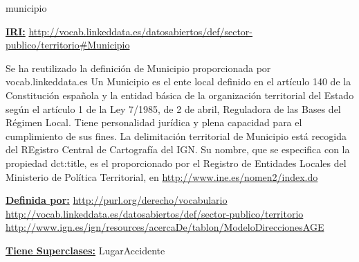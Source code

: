 \begin{mybox}{municipio}
\begin{flushleft}
\underline{\textbf{IRI:}}
\url{http://vocab.linkeddata.es/datosabiertos/def/sector-publico/territorio#Municipio}
\newline

Se ha reutilizado la definición de Municipio proporcionada por vocab.linkeddata.es \cite{datoabiertos_municipio}
Un Municipio es el ente local definido en el artículo 140 de la Constitución española y la entidad básica de la organización territorial del Estado según el artículo 1 de la Ley 7/1985, de 2 de abril, Reguladora de las Bases del Régimen Local. Tiene personalidad jurídica y plena capacidad para el cumplimiento de sus fines. La delimitación territorial de Municipio está recogida del REgistro Central de Cartografía del IGN. Su nombre, que se especifica con la propiedad dct:title, es el proporcionado por el Registro de Entidades Locales del Ministerio de Política Territorial, en \url{http://www.ine.es/nomen2/index.do}
\newline


\underline{\textbf{Definida por:}}
\url{http://purl.org/derecho/vocabulario}
\url{http://vocab.linkeddata.es/datosabiertos/def/sector-publico/territorio}
\url{http://www.ign.es/ign/resources/acercaDe/tablon/ModeloDireccionesAGE}
\newline

\underline{\textbf{Tiene Superclases:}}
\newline LugarAccidente



\end{flushleft}
\end{mybox}




